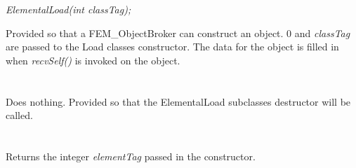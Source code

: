 {\em ElementalLoad(int classTag);}  

Provided so that a FEM\_ObjectBroker can construct an object. $0$ and
{\em classTag} are passed to the Load classes constructor. The data
for the object is filled in when {\em recvSelf()} is invoked on the
object.\\

 \\
\\ 
Does nothing. Provided so that the ElementalLoad subclasses destructor
will be called. \\

  \\
\indent{} \\
Returns the integer {\em elementTag} passed in the constructor. 
